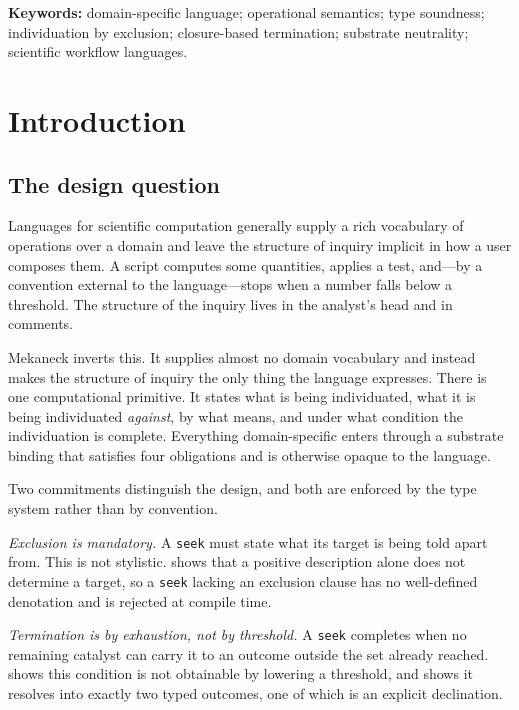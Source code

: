 \documentclass[11pt,a4paper]{article}
\theoremstyle{thmstyle}
\theoremstyle{definition}
\theoremstyle{remark}
\begin{document}
\noindent\textbf{Keywords:} domain-specific language; operational semantics;
type soundness; individuation by exclusion; closure-based termination;
substrate neutrality; scientific workflow languages.

\tableofcontents

\section{Introduction}
\label{sec:intro}

\subsection{The design question}

Languages for scientific computation generally supply a rich vocabulary of
operations over a domain and leave the structure of inquiry implicit in how
a user composes them. A script computes some quantities, applies a test,
and---by a convention external to the language---stops when a number falls
below a threshold. The structure of the inquiry lives in the analyst's head
and in comments.

Mekaneck inverts this. It supplies almost no domain vocabulary and instead
makes the structure of inquiry the only thing the language expresses. There
is one computational primitive. It states what is being individuated, what
it is being individuated \emph{against}, by what means, and under what
condition the individuation is complete. Everything domain-specific enters
through a substrate binding that satisfies four obligations and is otherwise
opaque to the language.

Two commitments distinguish the design, and both are enforced by the type
system rather than by convention.

\emph{Exclusion is mandatory.} A \texttt{seek} must state what its target is
being told apart from. This is not stylistic. 
shows that a positive description alone does not determine a target, so a
\texttt{seek} lacking an exclusion clause has no well-defined denotation and
is rejected at compile time.

\emph{Termination is by exhaustion, not by threshold.} A \texttt{seek}
completes when no remaining catalyst can carry it to an outcome outside the
set already reached.  shows this condition is not
obtainable by lowering a threshold, and  shows it
resolves into exactly two typed outcomes, one of which is an explicit
declination.
\end{document}
